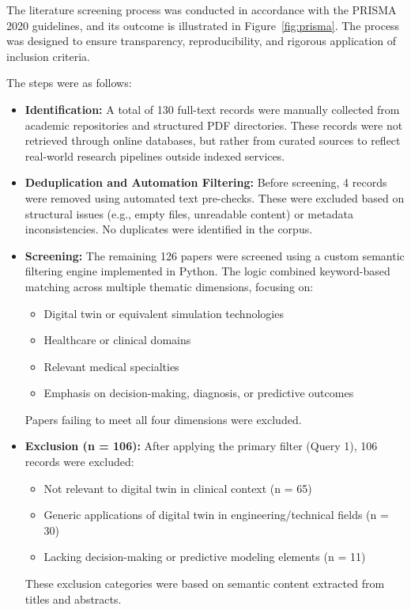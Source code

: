 \documentclass[10pt,a4paper]{article}
\begin{document}
The literature screening process was conducted in accordance with the PRISMA 2020 guidelines, and its outcome is illustrated in Figure~\ref{fig:prisma}. The process was designed to ensure transparency, reproducibility, and rigorous application of inclusion criteria.

\vspace{1em}
\noindent The steps were as follows:

\begin{itemize}
    \item \textbf{Identification:} A total of 130 full-text records were manually collected from academic repositories and structured PDF directories. These records were not retrieved through online databases, but rather from curated sources to reflect real-world research pipelines outside indexed services.
    
    \item \textbf{Deduplication and Automation Filtering:} Before screening, 4 records were removed using automated text pre-checks. These were excluded based on structural issues (e.g., empty files, unreadable content) or metadata inconsistencies. No duplicates were identified in the corpus.
    
    \item \textbf{Screening:} The remaining 126 papers were screened using a custom semantic filtering engine implemented in Python. The logic combined keyword-based matching across multiple thematic dimensions, focusing on:
    \begin{itemize}
        \item Digital twin or equivalent simulation technologies
        \item Healthcare or clinical domains
        \item Relevant medical specialties
        \item Emphasis on decision-making, diagnosis, or predictive outcomes
    \end{itemize}
    Papers failing to meet all four dimensions were excluded.
    
    \item \textbf{Exclusion (n = 106):} After applying the primary filter (Query 1), 106 records were excluded:
    \begin{itemize}
        \item Not relevant to digital twin in clinical context (n = 65)
        \item Generic applications of digital twin in engineering/technical fields (n = 30)
        \item Lacking decision-making or predictive modeling elements (n = 11)
    \end{itemize}
    These exclusion categories were based on semantic content extracted from titles and abstracts.
    

\end{itemize}
\end{document}
